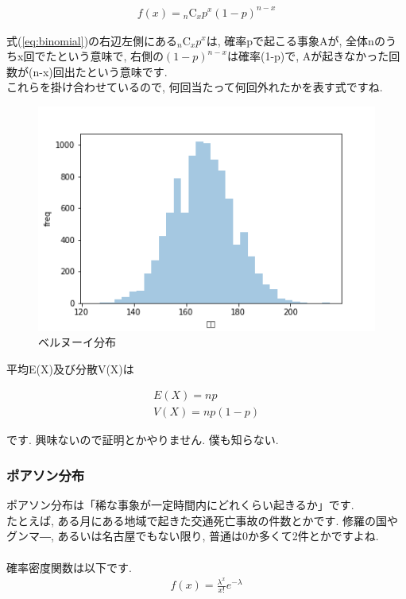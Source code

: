 \documentclass[11pt,a4paper]{jsarticle}                    %
\begin{document}
\begin{eqnarray}
\label{eq:binomial}
f(x) = {}_n\mathrm{C}_x p^x(1-p)^{n-x}
\end{eqnarray}

式(\ref{eq:binomial})の右辺左側にある${}_n\mathrm{C}_x p^x$は, 確率pで起こる事象Aが, 全体nのうちx回でたという意味で, 右側の$(1-p)^{n-x}$は確率(1-p)で, Aが起きなかった回数が(n-x)回出たという意味です.\\
これらを掛け合わせているので, 何回当たって何回外れたかを表す式ですね.

\begin{figure}[H]
\label{im:bernoulli}
  \centering
  \includegraphics[width=120mm,bb=0 0 432 288]{figures/binomial.png}
  \caption{ベルヌーイ分布}
\end{figure}

平均E(X)及び分散V(X)は

\begin{eqnarray}
E(X) = np\\
V(X) = np(1-p)
\end{eqnarray}

です. 興味ないので証明とかやりません. 僕も知らない.

\subsubsection{ポアソン分布}
ポアソン分布は「稀な事象が一定時間内にどれくらい起きるか」です.\\
たとえば, ある月にある地域で起きた交通死亡事故の件数とかです. 修羅の国やグンマ―, あるいは名古屋でもない限り, 普通は0か多くて2件とかですよね.\\
\\
確率密度関数は以下です.
\begin{eqnarray}
f(x) = \frac{\lambda^x}{x!}e^{-\lambda}
\end{eqnarray}
\end{document}
